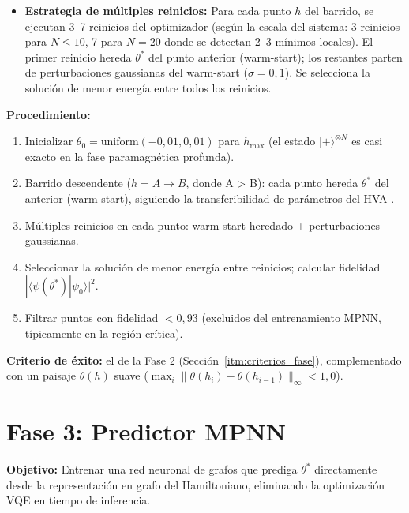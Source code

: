 \documentclass[11pt,a4paper,spanish]{book}
\begin{document}
\begin{itemize}
    \item \textbf{Estrategia de múltiples reinicios:} Para cada punto $h$ del barrido, se ejecutan 3--7 reinicios del optimizador (según la escala del sistema: 3 reinicios para $N \leq 10$, 7 para $N = 20$ donde se detectan 2--3 mínimos locales). El primer reinicio hereda $\theta^*$ del punto anterior (warm-start); los restantes parten de perturbaciones gaussianas del warm-start ($\sigma = 0,1$). Se selecciona la solución de menor energía entre todos los reinicios.
\end{itemize}

\textbf{Procedimiento:}
\begin{enumerate}
    \item Inicializar $\theta_0 = \text{uniform}(-0,01, 0,01)$ para $h_{\max}$ (el estado $|+\rangle^{\otimes N}$ es casi exacto en la fase paramagnética profunda).
    \item Barrido descendente ($h = A \to B$, donde A > B): cada punto hereda $\theta^*$ del anterior (warm-start), siguiendo la transferibilidad de parámetros del HVA \citep{mele2022, puig2025}.
    \item Múltiples reinicios en cada punto: warm-start heredado + perturbaciones gaussianas.
    \item Seleccionar la solución de menor energía entre reinicios; calcular fidelidad $|\langle \psi(\theta^*) | \psi_0 \rangle|^2$.
    \item Filtrar puntos con fidelidad $< 0,93$ (excluidos del entrenamiento MPNN, típicamente en la región crítica).
\end{enumerate}

\textbf{Criterio de éxito:} el de la Fase 2 (Sección~\ref{itm:criterios_fase}), complementado con un paisaje $\theta(h)$ suave ($\max_i \|\theta(h_i) - \theta(h_{i-1})\|_\infty < 1,0$).

\section{Fase 3: Predictor MPNN}

\textbf{Objetivo:} Entrenar una red neuronal de grafos que prediga $\theta^*$ directamente desde la representación en grafo del Hamiltoniano, eliminando la optimización VQE en tiempo de inferencia.
\end{document}
